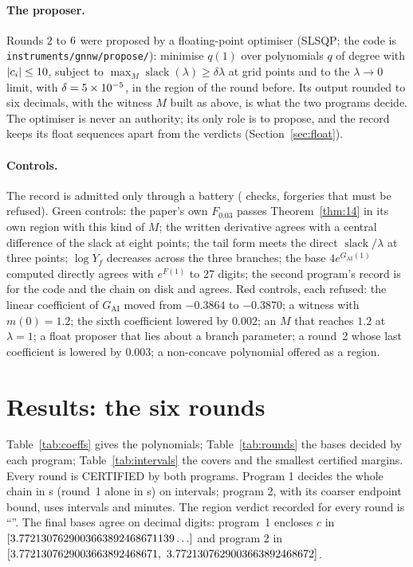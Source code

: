 \documentclass[11pt]{article}
\newcommand{\GAI}{G_{\mathrm{AI}}}
\newcommand{\slack}{\operatorname{slack}}
\begin{document}
\paragraph{The proposer.} Rounds $2$ to $6$ were proposed by a floating-point optimiser (SLSQP; the code is \texttt{instruments/\allowbreak gnnw/\allowbreak propose/}): minimise $q(1)$ over polynomials $q$ of degree \DegNew{} with $|c_i|\le10$, subject to $\max_M\slack(\lambda)\ge\delta\lambda$ at \GridPoints{} grid points and to the $\lambda\to0$ limit, with $\delta=5\times10^{-5}$, in the region of the round before. Its output rounded to six decimals, with the witness $M$ built as above, is what the two programs decide. The optimiser is never an authority; its only role is to propose, and the record keeps its float sequences apart from the verdicts (Section~\ref{sec:float}).

\paragraph{Controls.} The record is admitted only through a battery (\GnnwBattery{} checks, \GnnwRed{} forgeries that must be refused). Green controls: the paper's own $F_{0.03}$ passes Theorem~\ref{thm:14} in its own region with this kind of $M$; the written derivative agrees with a central difference of the slack at eight points; the tail form meets the direct $\slack/\lambda$ at three points; $\log Y_f$ decreases across the three branches; the base $4e^{\GAI(1)}$ computed directly agrees with $e^{F(1)}$ to 27 digits; the second program's record is for the code and the chain on disk and agrees. Red controls, each refused: the linear coefficient of $\GAI$ moved from $-0.3864$ to $-0.3870$; a witness with $m(0)=1.2$; the sixth coefficient lowered by $0.002$; an $M$ that reaches $1.2$ at $\lambda=1$; a float proposer that lies about a branch parameter; a round~2 whose last coefficient is lowered by $0.003$; a non-concave polynomial offered as a region.

\section{Results: the six rounds}\label{sec:results}

Table~\ref{tab:coeffs} gives the polynomials; Table~\ref{tab:rounds} the bases decided by each program; Table~\ref{tab:intervals} the covers and the smallest certified margins. Every round is CERTIFIED by both programs. Program 1 decides the whole chain in \SecondsChainPy{} s (round~1 alone in \SecondsOne{} s) on \IntervalsPyTotal{} intervals; program 2, with its coarser endpoint bound, uses \IntervalsJsTotal{} intervals and \MinutesChainJs{} minutes. The region verdict recorded for every round is ``\RegionVerdict''. The final bases agree on \AgreeDigits{} decimal digits: program~1 encloses $c$ in $[3.7721307629003663892468671139\ldots]$ and program 2 in $[3.7721307629003663892468671,\ 3.7721307629003663892468672]$.
\end{document}
